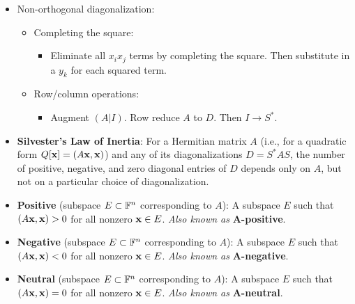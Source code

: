 \documentclass[../../notes.tex]{subfiles}
\begin{document}
\begin{itemize}
\begin{itemize}
    \end{itemize}
    \item Non-orthogonal diagonalization:
    \begin{itemize}
        \item Completing the square:
        \begin{itemize}
            \item Eliminate all $x_ix_j$ terms by completing the square. Then substitute in a $y_k$ for each squared term.
        \end{itemize}
        \item Row/column operations:
        \begin{itemize}
            \item Augment $(A|I)$. Row reduce $A$ to $D$. Then $I\to S^*$.
        \end{itemize}
    \end{itemize}
    \item {}\textbf{Silvester's Law of Inertia}: For a Hermitian matrix $A$ (i.e., for a quadratic form $Q[\mathbf{x}]=(A\mathbf{x},\mathbf{x})$) and any of its diagonalizations $D=S^*AS$, the number of positive, negative, and zero diagonal entries of $D$ depends only on $A$, but not on a particular choice of diagonalization.
    \item \textbf{Positive} (subspace $E\subset\mathbb{F}^n$ corresponding to $A$): A subspace $E$ such that $(A\mathbf{x},\mathbf{x})>0$ for all nonzero $\mathbf{x}\in E$. \emph{Also known as} \textbf{$\bm{A}$-positive}.
    \item \textbf{Negative} (subspace $E\subset\mathbb{F}^n$ corresponding to $A$): A subspace $E$ such that $(A\mathbf{x},\mathbf{x})<0$ for all nonzero $\mathbf{x}\in E$. \emph{Also known as} \textbf{$\bm{A}$-negative}.
    \item \textbf{Neutral} (subspace $E\subset\mathbb{F}^n$ corresponding to $A$): A subspace $E$ such that $(A\mathbf{x},\mathbf{x})=0$ for all nonzero $\mathbf{x}\in E$. \emph{Also known as} \textbf{$\bm{A}$-neutral}.

\end{itemize}
\end{document}
